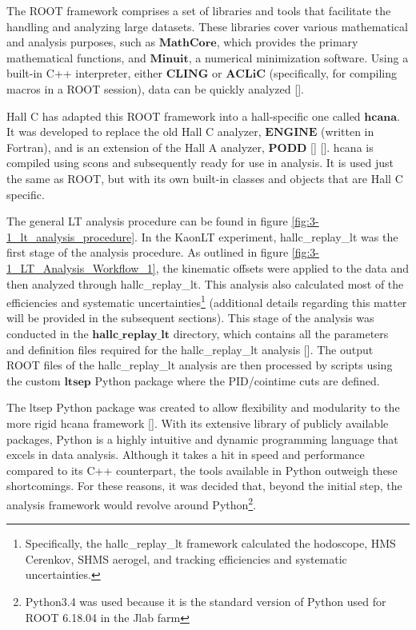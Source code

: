 \documentclass[
]{report}
\begin{document}
The ROOT framework comprises a set of libraries and tools that
facilitate the handling and analyzing large datasets. These libraries
cover various mathematical and analysis purposes, such as
\(\textbf{MathCore}\), which provides the primary mathematical
functions, and \(\textbf{Minuit}\), a numerical minimization software.
Using a built-in C++ interpreter, either \(\textbf{CLING}\) or
\(\textbf{ACLiC}\) (specifically, for compiling macros in a ROOT
session), data can be quickly analyzed {[}\cite{root_team_root_2023}{]}.

Hall C has adapted this ROOT framework into a hall-specific one called
\(\textbf{hcana}\). It was developed to replace the old Hall C analyzer,
\(\textbf{ENGINE}\) (written in Fortran), and is an extension of the
Hall A analyzer, \(\textbf{PODD}\) {[}\cite{jones_hall_2022}{]}
{[}\cite{brash_github_2014}{]}. hcana is compiled using scons and
subsequently ready for use in analysis. It is used just the same as
ROOT, but with its own built-in classes and objects that are Hall C
specific.

\label{Chapter-3-1}



The general LT analysis procedure can be found in figure
\ref{fig:3-1_lt_analysis_procedure}. In the KaonLT experiment,
hallc\_replay\_lt was the first stage of the analysis procedure. As
outlined in figure \ref{fig:3-1_LT_Analysis_Workflow_1}, the kinematic
offsets were applied to the data and then analyzed through
hallc\_replay\_lt. This analysis also calculated most of the
efficiencies and systematic
uncertainties\footnote{Specifically, the hallc\_replay\_lt framework calculated the hodoscope, HMS Cerenkov, SHMS aerogel, and tracking efficiencies and systematic uncertainties.}
(additional details regarding this matter will be provided in the
subsequent sections). This stage of the analysis was conducted in the
\(\textbf{hallc\_replay\_lt}\) directory, which contains all the
parameters and definition files required for the hallc\_replay\_lt
analysis {[}\cite{kay_github_2018-1}{]}. The output ROOT files of the
hallc\_replay\_lt analysis are then processed by scripts using the
custom \(\textbf{ltsep}\) Python package where the PID/cointime cuts are
defined.



The ltsep Python package was created to allow flexibility and modularity
to the more rigid hcana framework {[}\cite{trotta_github_2020}{]}. With
its extensive library of publicly available packages, Python is a highly
intuitive and dynamic programming language that excels in data analysis.
Although it takes a hit in speed and performance compared to its C++
counterpart, the tools available in Python outweigh these shortcomings.
For these reasons, it was decided that, beyond the initial step, the
analysis framework would revolve around
Python\footnote{Python3.4 was used because it is the standard version of Python used for ROOT 6.18.04 in the Jlab farm}.
\end{document}
